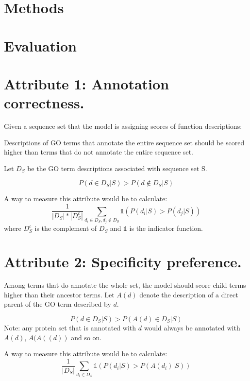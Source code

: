 \documentclass{specification}
\begin{document}
\section{Methods}
\section{Evaluation}
\section*{Attribute 1: Annotation correctness.}

Given a sequence set that the model is assigning scores of function descriptions:

Descriptions of GO terms that annotate the entire sequence set should be scored higher than terms that do not annotate the entire sequence set.

Let $D_{S}$ be the GO term descriptions associated with sequence set S.

\[P(d \in D_{S} | S) > P(d \notin D_{S} | S)\]


A way to measure this attribute would be to calculate:
\[\frac{1}{|D_{S}|*|D_{S}^{c}|}\sum_{d_i \in D_{S}, d_j \notin D_{S}} \mathds{1}(P(d_i | S) > P(d_j | S))\]
where $D_{S}^{c}$ is the complement of $D_{S}$ and $\mathds{1}$ is the indicator function.

\section*{Attribute 2: Specificity preference.}

Among terms that do annotate the whole set, the model should score child terms higher than their ancestor terms. Let $A(d)$ denote the description of a direct parent of the GO term described by $d$.

\[P(d \in D_{S}| S) > P(A(d) \in D_{S}| S)\]
Note: any protein set that is annotated with $d$ would always be annotated with $A(d)$, $A(A((d))$ and so on.


A way to measure this attribute would be to calculate:
\[\frac{1}{|D_{S}|}\sum_{d_i \in D_{S}} \mathds{1}(P(d_i | S) > P(A(d_i) | S))\]
\end{document}
